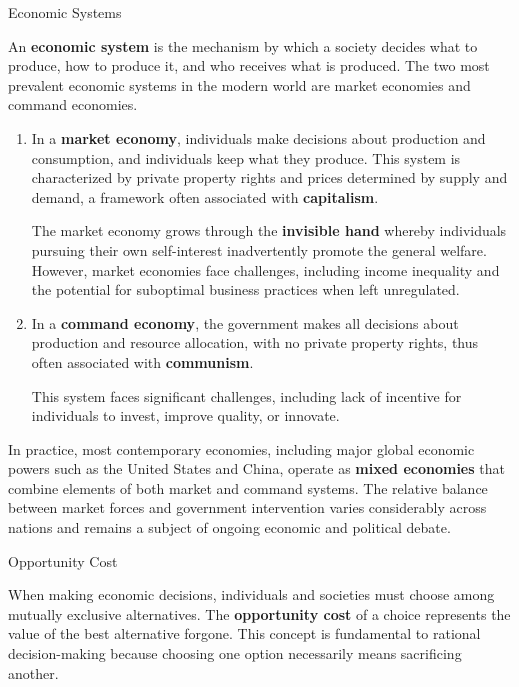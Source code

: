 \documentclass[10pt]{article}
\begin{document}
  \begin{core}{Economic Systems}

    An \textbf{economic system} is the mechanism by which a society decides what to produce, how to produce it, and who receives what is produced. The two most prevalent economic systems in the modern world are market economies and command economies.

    \begin{enumerate}

      \item In a \textbf{market economy}, individuals make decisions about production and consumption, and individuals keep what they produce. This system is characterized by private property rights and prices determined by supply and demand, a framework often associated with \textbf{capitalism}.

      The market economy grows through the \textbf{invisible hand} whereby individuals pursuing their own self-interest inadvertently promote the general welfare. However, market economies face challenges, including income inequality and the potential for suboptimal business practices when left unregulated.

      \item In a \textbf{command economy}, the government makes all decisions about production and resource allocation, with no private property rights, thus often associated with \textbf{communism}. 

      This system faces significant challenges, including lack of incentive for individuals to invest, improve quality, or innovate.

    \end{enumerate}

    In practice, most contemporary economies, including major global economic powers such as the United States and China, operate as \textbf{mixed economies} that combine elements of both market and command systems. The relative balance between market forces and government intervention varies considerably across nations and remains a subject of ongoing economic and political debate.

  \end{core}

  \begin{core}{Opportunity Cost}

    When making economic decisions, individuals and societies must choose among mutually exclusive alternatives. The \textbf{opportunity cost} of a choice represents the value of the best alternative forgone. This concept is fundamental to rational decision-making because choosing one option necessarily means sacrificing another.

  \end{core}
\end{document}
